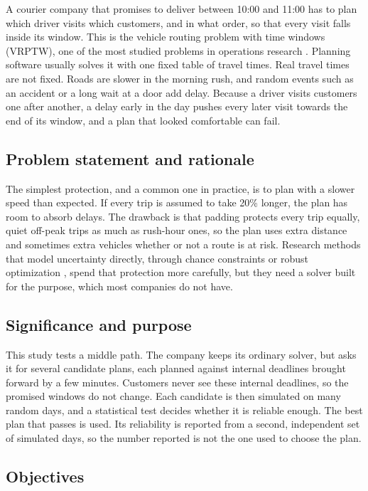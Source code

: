 \documentclass[12pt,letterpaper]{article}
\begin{document}
A courier company that promises to deliver between 10:00 and 11:00 has to plan
which driver visits which customers, and in what order, so that every visit falls
inside its window. This is the vehicle routing problem with time windows (VRPTW),
one of the most studied problems in operations research \cite{solomon1987,toth2014}.
Planning software usually solves it with one fixed table of travel times. Real
travel times are not fixed. Roads are slower in the morning rush, and random events
such as an accident or a long wait at a door add delay. Because a driver visits
customers one after another, a delay early in the day pushes every later visit
towards the end of its window, and a plan that looked comfortable can fail.

\subsection{Problem statement and rationale}

The simplest protection, and a common one in practice, is to plan with a slower
speed than expected. If every trip is assumed to take 20\% longer, the plan has room
to absorb delays. The drawback is that padding protects every trip equally, quiet
off-peak trips as much as rush-hour ones, so the plan uses extra distance and
sometimes extra vehicles whether or not a route is at risk. Research methods that
model uncertainty directly, through chance constraints or robust
optimization \cite{errico2018,agra2013,gendreau2016}, spend that protection more
carefully, but they need a solver built for the purpose, which most companies do
not have.

\subsection{Significance and purpose}

This study tests a middle path. The company keeps its ordinary solver, but asks it
for several candidate plans, each planned against internal deadlines brought
forward by a few minutes. Customers never see these internal deadlines, so the
promised windows do not change. Each candidate is then simulated on many random
days, and a statistical test decides whether it is reliable enough. The best plan
that passes is used. Its reliability is reported from a second, independent set of
simulated days, so the number reported is not the one used to choose the plan.

\subsection{Objectives}
\end{document}
